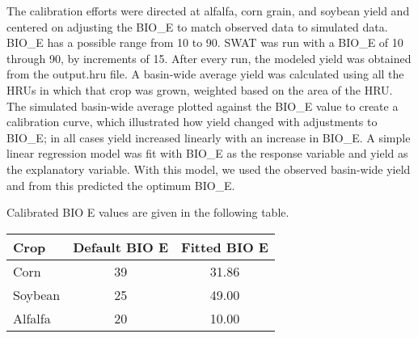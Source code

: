 The calibration efforts were directed at alfalfa, corn grain, and soybean yield and centered on adjusting the BIO\_E to match observed data to simulated data. 
BIO\_E has a possible range from 10 to 90. SWAT was run with a BIO\_E of 10 through 90, by increments of 15. After every run, the modeled yield was obtained from the output.hru file. A basin-wide average yield was calculated using all the HRUs in which that crop was grown, weighted based on the area of the HRU. The simulated basin-wide average plotted against the BIO\_E value to create a calibration curve, which illustrated how yield changed with adjustments to BIO\_E; in all cases yield increased linearly with an increase in BIO\_E. A simple linear regression model was fit with BIO\_E as the response variable and yield as the explanatory variable. With this model, we used the observed basin-wide yield and from this predicted the optimum BIO\_E.  

Calibrated BIO E values are given in the following table. 

\begin{table}[h!] \centering
	\begin{tabular}{l c c}
		\hline
		Crop & Default BIO E & Fitted BIO E \\[0.25ex]
		\hline \hline
		Corn & 39 & 31.86 \\
		Soybean & 25 & 49.00 \\
		Alfalfa & 20 & 10.00 \\
		\hline

	\end{tabular}
\end{table}	
\pagebreak